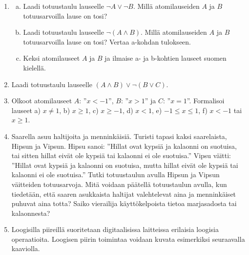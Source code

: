 \begin{enumerate}
\item
\begin{enumerate}[a)]
\item Laadi totuustaulu lauseelle $\lnot A\lor \lnot
B$. Millä atomilauseiden $A$ ja $B$ totuusarvoilla lause
on tosi?
\item Laadi totuustaulu lauseelle $\lnot(A\land B)$.
Millä atomilauseiden $A$ ja $B$ totuusarvoilla lause on
tosi? Vertaa a-kohdan tulokseen.
\item Keksi atomilauseet $A$ ja $B$ ja ilmaise a- ja
b-kohtien lauseet suomen kielellä.
\end{enumerate}

\item Laadi totuustaulu lauseelle $(A\land B)\lor \lnot (B\lor C)$.

\item Olkoot atomilauseet $A$: ''$x < -1$'', $B$: ''$x > 1$''  ja $C$: ''$x = 1$''. Formalisoi  lauseet  
a)  $x\neq 1$,   b) $x \ge 1$,   c)  $x \ge -1$,  d)  $x < 1$,  e)  $-1 \le x \le  1$, 
f) $x <  -1$ tai $x  \ge 1$.        

\item
Saarella asuu haltijoita ja menninkäisiä. Turisti tapasi kaksi saarelaista, Hipsun ja Vipsun. Hipsu sanoi: ''Hillat ovat kypsiä ja kalaonni on suotuisa, tai sitten hillat eivät ole kypsiä tai kalaonni ei ole suotuisa.'' Vipsu väitti: ''Hillat ovat kypsiä ja kalaonni on suotuisa, mutta hillat eivät ole kypsiä tai kalaonni ei ole suotuisa.'' Tutki totuustaulun avulla Hipsun ja Vipsun väitteiden totuusarvoja. Mitä voidaan päätellä totuustaulun avulla, kun tiedetään, että saaren asukkaista haltijat valehtelevat aina ja menninkäiset puhuvat aina totta? Saiko vierailija käyttökelpoista tietoa marjasadosta tai kalaonnesta?




\item
Loogisilla piireillä suoritetaan digitaalisissa laitteissa erilaisia loogisia operaatioita. Loogisen piirin toimintaa voidaan kuvata esimerkiksi seuraavalla kaaviolla.

\medskip

\begin{center}
\end{center}
\end{enumerate}

